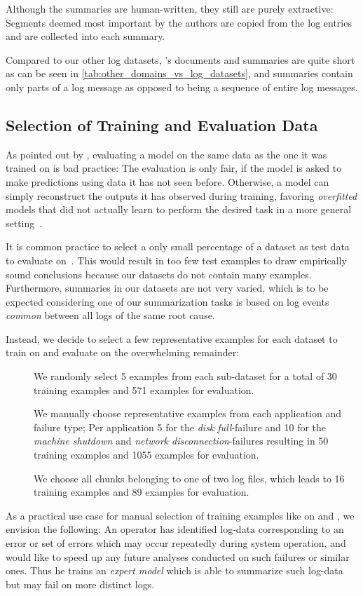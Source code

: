 Although the summaries are human-written, they still are purely extractive:
Segments deemed most important by the authors are copied from the log entries
and are collected into each summary.

Compared to our other log datasets, \logsummary{}'s documents and summaries are quite short as can be seen in \autoref{tab:other_domains_vs_log_datasets},
and summaries contain only parts of a log message as opposed to being a sequence of entire log messages.

\subsection{Selection of Training and Evaluation Data}\label{subsec:training_test_split}

As pointed out by \citeauthor*{statistical_nlp},
evaluating a model on the same data as the one it was trained on is bad practice:
The evaluation is only fair, if the model is asked to make predictions using data it has not seen before.
Otherwise, a model can simply reconstruct the outputs it has observed during training,
favoring \emph{overfitted} models that did not actually learn to perform the desired task in a more general setting~\parencite[74-75]{statistical_nlp}.

It is common practice to select a only small percentage of a dataset as test data to evaluate on~\parencite{statistical_nlp}.
This would result in too few test examples to draw empirically sound conclusions
because our datasets do not contain many examples.
Furthermore, summaries in our datasets are not very varied,
which is to be expected considering one of our summarization tasks is based on log events \emph{common} between all logs of the same root cause.

Instead, we decide to select a few representative examples for each dataset to train on and evaluate on the overwhelming remainder:
\begin{description}
\item[\logsummary] We randomly select 5 examples from each sub-dataset for a total of 30 training examples and 571 examples for evaluation.
\item[\hadoop] We manually choose representative examples from each application and failure type;
      Per application 5 for the \emph{disk full}-failure and 10 for the \emph{machine shutdown} and
      \emph{network disconnection}-failures resulting in 50 training examples and 1055 examples for evaluation.
\item[\telco] We choose all chunks belonging to one of two log files,
      which leads to 16 training examples and 89 examples for evaluation.
\end{description}
As a practical use case for manual selection of training examples
like on \hadoop{} and \telco{}, we envision the following:
An operator has identified log-data corresponding to an error or set of errors
which may occur repeatedly during system operation,
and would like to speed up any future analyses conducted on such failures or similar ones.
Thus he trains an \emph{expert model} which is able to summarize such log-data
but may fail on more distinct logs.


